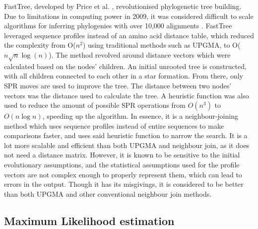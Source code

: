 \documentclass{mpaper}
\begin{document}
FastTree, developed by Price et al. \cite{fasttree1}, revolutionised phylogenetic tree building. Due to limitations in computing power in 2009, it was considered difficult to scale algorithms for inferring phylogenies with over 10,000 alignments \cite{fasttree1}. FastTree leveraged sequence profiles instead of an amino acid distance table, which reduced the complexity from O($n^2$) using traditional methods such as UPGMA, to O($n\sqrt{n} \log{(n)}$). The method revolved around distance vectors which were calculated based on the nodes' children. An initial unrooted tree is constructed, with all children connected to each other in a star formation. From there, only SPR moves are used to improve the tree. The distance between two nodes' vectors was the distance used to calculate the tree. A heuristic function was also used to reduce the amount of possible SPR operations from $O(n^{3})$ to $O(n\log n)$, speeding up the algorithm. In essence, it is a neighbour-joining method which uses sequence profiles instead of entire sequences to make comparisons faster, and uses said heuristic function to narrow the search. It is a lot more scalable and efficient than both UPGMA and neighbour join, as it does not need a distance matrix. However, it is known to be sensitive to the initial evolutionary assumptions, and the statistical assumptions used for the profile vectors are not complex enough to properly represent them, which can lead to errors in the output. Though it has its misgivings, it is considered to be better than both UPGMA and other conventional neighbour join methods.

\subsection{Maximum Likelihood estimation}
\end{document}
